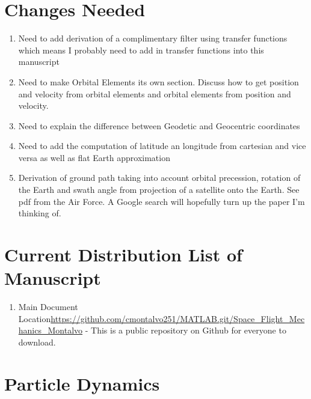 \documentclass{article}
\begin{document}
\newpage

\section*{Changes Needed}

\begin{enumerate}[itemsep=-5pt]
\item Need to add derivation of a complimentary filter using
  transfer functions which means I probably need to add in transfer
  functions into this manuscript
\item Need to make Orbital Elements its own section. Discuss how to
  get position and velocity from orbital elements and orbital elements
  from position and velocity.
\item Need to explain the difference between Geodetic and Geocentric
  coordinates
\item Need to add the computation of latitude an longitude from
  cartesian and vice versa as well as flat Earth approximation
\item Derivation of ground path taking into account orbital
  precession, rotation of the Earth and swath angle from projection of
  a satellite onto the Earth. See pdf from the Air Force. A Google
  search will hopefully turn up the paper I'm thinking of.
\end{enumerate}

\newpage

\section*{Current Distribution List of Manuscript}
\begin{enumerate}[itemsep=-5pt]
\item Main Document Location\url{https://github.com/cmontalvo251/MATLAB.git/Space_Flight_Mechanics_Montalvo} - This is a public
  repository on Github for everyone to download.
\end{enumerate}
  
\newpage

\tableofcontents

\newpage


\section{Particle Dynamics}
\end{document}
